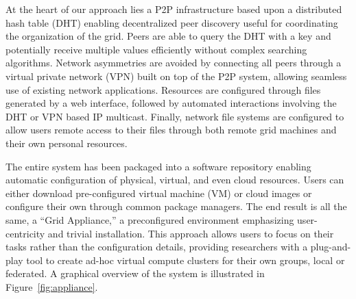 \documentclass[conference]{IEEEtran}
\begin{document}
At the heart of our approach lies a P2P infrastructure based upon a distributed
hash table (DHT) enabling decentralized peer discovery useful for coordinating
the organization of the grid.  Peers are able to query the DHT with a key and
potentially receive multiple values efficiently without complex searching
algorithms.  Network asymmetries are avoided by connecting all peers through a
virtual private network (VPN) built on top of the P2P system, allowing seamless
use of existing network applications.  Resources are configured through files
generated by a web interface, followed by automated interactions involving the
DHT or VPN based IP multicast.  Finally, network file systems are configured to
allow users remote access to their files through both remote grid machines and
their own personal resources.

The entire system has been packaged into a software repository enabling
automatic configuration of physical, virtual, and even cloud resources.  Users
can either download pre-configured virtual machine (VM) or cloud images or
configure their own through common package managers.  The end result is all the
same, a ``Grid Appliance,'' a preconfigured environment emphasizing
user-centricity and trivial installation.  This approach allows users to focus
on their tasks rather than the configuration details, providing researchers
with a plug-and-play tool to create ad-hoc virtual compute clusters for their
own groups, local or federated.  A graphical overview of the system is
illustrated in Figure~\ref{fig:appliance}.
\end{document}
